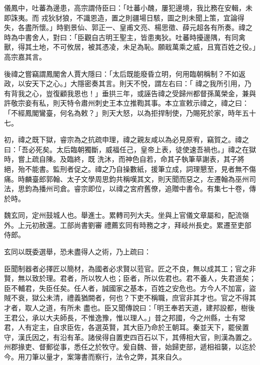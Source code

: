 \begin{pinyinscope}
 儀鳳中，吐蕃為邊患，高宗謂侍臣曰：「吐蕃小醜，屢犯邊境，我比務在安輯，未即誅夷。而
 戎狄豺狼，不識恩造，置之則疆場日駭，圖之則未聞上策，宜論得失，各盡所懷。」時劉景仙、郭正一、皇甫文亮、楊思徵、薛元超各有所奏。禕之時為中書舍人，對曰：「臣觀自古明王聖主，皆患夷狄。吐蕃時擾邊隅，有同禽獸，得其土地，不可攸居，被其憑凌，未足為恥。願戢萬乘之威，且寬百姓之役。」高宗嘉其言。



 後禕之嘗竊謂鳳閣舍人賈大隱曰：「太后既能廢昏立明，何用臨朝稱制？不如返政，以安天下之心。」大隱密奏其言。則天不悅，謂左右曰：「
 禕之我所引用，乃有背我之心，豈復顧我恩也！」垂拱三年，或誣告禕之受歸州都督孫萬榮金，兼與許敬宗妾有私，則天特令肅州刺史王本立推鞫其事。本立宣敕示禕之，禕之曰：「不經鳳閣鸞臺，何名為敕？」則天大怒，以為拒捍制使，乃賜死於家，時年五十七。



 初，禕之既下獄，睿宗為之抗疏申理，禕之親友咸以為必見原宥，竊賀之。禕之曰：「吾必死矣。太后臨朝獨斷，威福任己，皇帝上表，徒使速吾禍也。」禕之在獄時，嘗上疏自陳。及臨終，既
 洗沐，而神色自若，命其子執筆草謝表，其子將絕，殆不能書。監刑者促之。禕之乃自操數紙，援筆立成，詞理懇至，見者無不傷痛。時麟臺郎郭翰、太子文學周思鈞共稱嘆其文，則天聞而惡之，左遷翰為巫州司法，思鈞為播州司倉。睿宗即位，以禕之宮府舊僚，追贈中書令。有集七十卷，傳於時。



 魏玄同，定州鼓城人也。舉進士。累轉司列大夫。坐與上官儀文章屬和，配流嶺外。上元初赦還。工部尚書劉審
 禮薦玄同有時務之才，拜岐州長史。累遷至吏部侍郎。



 玄同以既委選舉，恐未盡得人之術，乃上疏曰：



 臣聞制器者必擇匠以簡材，為國者必求賢以蒞官。匠之不良，無以成其工；官之非賢，無以致於理。君者，所以牧人也；臣者，所以佐君也。君不養人，失君道矣；臣不輔君，失臣任矣。任人者，誠國家之基本，百姓之安危也。方今人不加富，盜賊不衰，獄公未清，禮義猶闕者，何也？下吏不稱職，庶官非其才也。官之不得其才者，取人之道，有所未
 盡也。臣又聞傳說曰：「明王奉若天道，建邦設都，樹後王君公，承以大夫師長，不惟逸豫，惟以理人。」昔之邦國，今之州縣，士有常君，人有定主，自求臣佐，各選英賢，其大臣乃命於王朝耳。秦並天下，罷侯置守，漢氏因之，有沿有革。諸侯得自置吏四百石以下，其傅相大官，則漢為置之。州郡掾吏、督郵從事，悉任之於牧守。爰自魏、晉，始歸吏部，遞相祖襲，以迄於今。用刀筆以量才，案簿書而察行，法令之弊，其來自久。




\end{pinyinscope}
